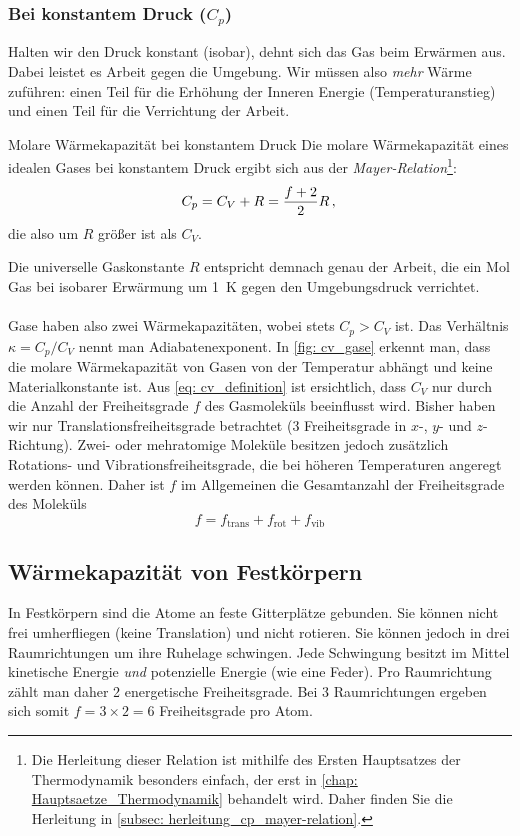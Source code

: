 \subsubsection{Bei konstantem Druck ($C_p$)}
Halten wir den Druck konstant (isobar), dehnt sich das Gas beim Erwärmen aus. Dabei leistet es Arbeit gegen die Umgebung. Wir müssen also \textit{mehr} Wärme zuführen: einen Teil für die Erhöhung der Inneren Energie (Temperaturanstieg) und einen Teil für die Verrichtung der Arbeit.
\begin{importantbox}{Molare Wärmekapazität bei konstantem Druck}
    Die molare Wärmekapazität eines idealen Gases bei konstantem Druck ergibt sich aus der \textit{Mayer-Relation}\footnote{Die Herleitung dieser Relation ist mithilfe des Ersten Hauptsatzes der Thermodynamik besonders einfach, der erst in \cref{chap: Hauptsaetze_Thermodynamik} behandelt wird. Daher finden Sie die Herleitung in \cref{subsec: herleitung_cp_mayer-relation}.}:
    \begin{equation}\label{eq: cp_definition_ideal_gas}
        C_p = C_V + R = \frac{f+2}{2} R \,{,}\,
    \end{equation}
    die also um $R$ größer ist als $C_V$.
\end{importantbox}
Die universelle Gaskonstante $R$ entspricht demnach genau der Arbeit, die ein Mol Gas bei isobarer Erwärmung um \SI{1}{\kelvin} gegen den Umgebungsdruck verrichtet. \\
\\
Gase haben also zwei Wärmekapazitäten, wobei stets $C_p > C_V$ ist. Das Verhältnis $\kappa = C_p/C_V$ nennt man Adiabatenexponent. 
In \cref{fig: cv_gase} erkennt man, dass die molare Wärmekapazität von Gasen von der Temperatur abhängt und keine Materialkonstante ist. Aus \cref{eq: cv_definition} ist ersichtlich, dass $C_V$ nur durch die Anzahl der Freiheitsgrade $f$ des Gasmoleküls beeinflusst wird. Bisher haben wir nur Translationsfreiheitsgrade betrachtet (3 Freiheitsgrade in $x$-, $y$- und $z$-Richtung). Zwei- oder mehratomige Moleküle besitzen jedoch zusätzlich Rotations- und Vibrationsfreiheitsgrade, die bei höheren Temperaturen angeregt werden können.
Daher ist $f$ im Allgemeinen die Gesamtanzahl der Freiheitsgrade des Moleküls 
\begin{equation}\label{eq: f_gesamt_freiheitsgrade}
    f = f_\text{trans} + f_\text{rot} + f_\text{vib}
\end{equation}

\subsection{Wärmekapazität von Festkörpern}\label{subsec: waermekapazitaet_festkoerper}
In Festkörpern sind die Atome an feste Gitterplätze gebunden. Sie können nicht frei umherfliegen (keine Translation) und nicht rotieren. Sie können jedoch in drei Raumrichtungen um ihre Ruhelage schwingen.
Jede Schwingung besitzt im Mittel kinetische Energie \textit{und} potenzielle Energie (wie eine Feder). Pro Raumrichtung zählt man daher 2 energetische Freiheitsgrade.
Bei 3 Raumrichtungen ergeben sich somit $f = 3 \times 2 = 6$ Freiheitsgrade pro Atom.

